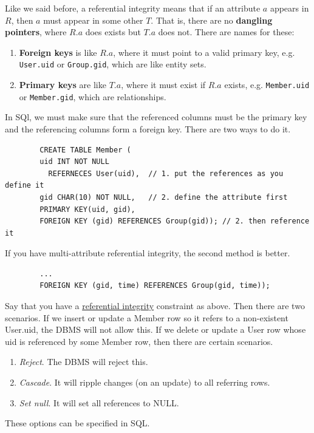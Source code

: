     \begin{definition}
      \label{def:referential-integrity}
      Like we said before, a referential integrity means that if an attribute $a$ appears in $R$, then $a$ must appear in some other $T$. That is, there are no \textbf{dangling pointers}, where $R.a$ does exists but $T.a$ does not. There are names for these: 
      \begin{enumerate}
        \item \textbf{Foreign keys} is like $R.a$, where it must point to a valid primary key, e.g. \texttt{User.uid} or \texttt{Group.gid}, which are like entity sets. 
        \item \textbf{Primary keys} are like $T.a$, where it must exist if $R.a$ exists, e.g. \texttt{Member.uid} or \texttt{Member.gid}, which are relationships. 
      \end{enumerate}
      In SQl, we must make sure that the referenced columns must be the primary key and the referencing columns form a foreign key. There are two ways to do it. 
      \begin{lstlisting}
        CREATE TABLE Member (
        uid INT NOT NULL 
          REFERNECES User(uid),  // 1. put the references as you define it
        gid CHAR(10) NOT NULL,   // 2. define the attribute first
        PRIMARY KEY(uid, gid), 
        FOREIGN KEY (gid) REFERENCES Group(gid)); // 2. then reference it
      \end{lstlisting}
      If you have multi-attribute referential integrity, the second method is better. 
      \begin{lstlisting}
        ...
        FOREIGN KEY (gid, time) REFERENCES Group(gid, time)); 
      \end{lstlisting}
    \end{definition}

    \begin{example}
      \label{ex:handling-referential-integrity-violations}
      Say that you have a \hyperref[def:referential-integrity]{referential integrity} constraint as above. Then there are two scenarios. If we insert or update a Member row so it refers to a non-existent User.uid, the DBMS will not allow this. If we delete or update a User row whose uid is referenced by some Member row, then there are certain scenarios. 
      \begin{enumerate}
        \item \textit{Reject}. The DBMS will reject this. 
        \item \textit{Cascade}. It will ripple changes (on an update) to all referring rows. 
        \item \textit{Set null}. It will set all references to NULL. 
      \end{enumerate}
      These options can be specified in SQL. 
    \end{example}

